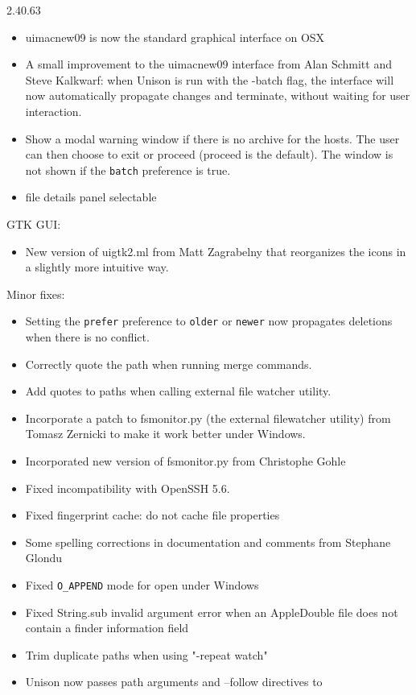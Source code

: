 \begin{changesfromversion}{2.40.63}
\begin{itemize}
\item uimacnew09 is now the standard graphical interface on OSX
\item A small improvement to the uimacnew09 interface from Alan Schmitt
  and Steve Kalkwarf: when Unison is run with the -batch flag, the
  interface will now automatically propagate changes and terminate,
  without waiting for user interaction.
\item Show a modal warning window if there is no archive for the hosts.  The
user can then choose to exit or proceed (proceed is the default). The window
is not shown if the {\tt batch} preference is true.
\item file details panel selectable
\end{itemize}
\item GTK GUI:
\begin{itemize}
\item New version of uigtk2.ml from Matt Zagrabelny that reorganizes the
icons in a slightly more intuitive way.
\end{itemize}
\item Minor fixes:
\begin{itemize}
\item Setting the {\tt prefer} preference to {\tt older} or {\tt newer} now
propagates deletions when there is no conflict.
\item Correctly quote the path when running merge commands.
\item Add quotes to paths when calling external file watcher utility.
\item Incorporate a patch to fsmonitor.py (the external filewatcher
  utility) from Tomasz Zernicki to make it work better under Windows.
\item Incorporated new version of fsmonitor.py from Christophe Gohle
\item Fixed incompatibility with OpenSSH 5.6.
\item Fixed fingerprint cache: do not cache file properties
\item Some spelling corrections in documentation and comments from Stephane
Glondu
\item Fixed {\tt O\_APPEND} mode for open under Windows
\item Fixed String.sub invalid argument error when an AppleDouble file does
  not contain a finder information field
\item Trim duplicate paths when using "-repeat watch"
\item Unison now passes path arguments and --follow directives to

\end{itemize}
\end{changesfromversion}
